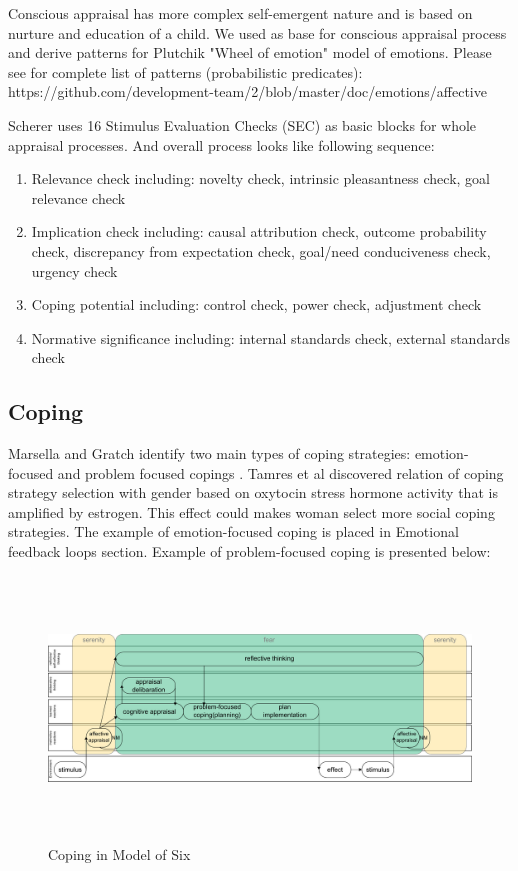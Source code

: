 Conscious appraisal has more complex self-emergent nature and is based on nurture and education of a child. We used \cite{appraisal_considered_as_a_process} as base for conscious appraisal process and derive patterns for Plutchik "Wheel of emotion" model of emotions. Please see for complete list of patterns (probabilistic predicates): https://github.com/development-team/2/blob/master/doc/emotions/affective%

Scherer uses 16 Stimulus Evaluation Checks (SEC) as basic blocks for whole appraisal processes. And overall process looks like following sequence:

\begin{enumerate}
 \item  Relevance check including: novelty check, intrinsic pleasantness check, goal relevance check
 \item  Implication check including: causal attribution check, outcome probability check, discrepancy from expectation check, goal/need conduciveness check, urgency check
 \item  Coping potential including: control check, power check, adjustment check
 \item  Normative significance including: internal standards check, external standards check
\end{enumerate}

\subsection{Coping}

Marsella and Gratch identify two main types of coping strategies: emotion-focused and problem focused copings \cite{dont_worry_be_happy}. Tamres et al discovered relation of coping strategy selection with gender \cite{sex_differencies} based on oxytocin stress hormone activity that is amplified by estrogen. This effect could makes woman select more social coping strategies.
The example of emotion-focused coping is placed in Emotional feedback loops section.
Example of problem-focused coping is presented below:

\begin{figure}
\begin{center}
 \includegraphics[height=7cm, angle=90]{figure4_coping}
\end{center}
\caption{Coping in Model of Six}
\end{figure}


